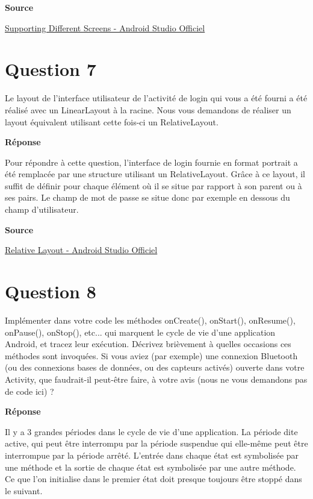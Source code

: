 \documentclass[francais,12pt]{article}
\begin{document}
		\textbf{Source}
        
        \href{https://developer.android.com/training/basics/supporting-devices/screens.html}{Supporting Different Screens - Android Studio Officiel}
		
	\section*{Question 7}
		Le layout de l'interface utilisateur de l'activité de login qui vous a été fourni a été réalisé avec un LinearLayout à la racine. Nous vous demandons de réaliser un layout équivalent utilisant cette fois-ci un RelativeLayout.  
		
		{\color[rgb]{0,0.5,0.23}\textbf{Réponse}}
        
		Pour répondre à cette question, l'interface de login fournie en format portrait a été remplacée par
une structure utilisant un RelativeLayout. Grâce à ce layout, il suffit de définir pour chaque élément où il se situe par rapport à son parent ou à ses pairs. Le champ de mot de passe se situe donc par exemple en dessous du champ d'utilisateur. 
		
		\textbf{Source}
        
        \href{https://developer.android.com/guide/topics/ui/layout/relative.html}{Relative Layout - Android Studio Officiel}
		
		\newpage
	\section*{Question 8}
		Implémenter dans votre code les méthodes onCreate(), onStart(), onResume(), onPause(), onStop(), etc... qui marquent le cycle de vie d'une application Android, et tracez leur exécution. Décrivez brièvement à quelles occasions ces méthodes sont invoquées. Si vous aviez (par exemple) une connexion Bluetooth (ou des connexions bases de données, ou des capteurs activés) ouverte dans votre Activity, que faudrait-il peut-être faire, à votre avis (nous ne vous demandons pas de code ici) ? 
		
		{\color[rgb]{0,0.5,0.23}\textbf{Réponse}}
        
		Il y a 3 grandes périodes dans le cycle de vie d'une application. La période dite active, qui peut être interrompu par la période	suspendue qui elle-même peut être interrompue par la période arrêté.
		L'entrée dans chaque état est symbolisée par une méthode et la sortie de chaque état est symbolisée par une autre méthode. Ce que l'on initialise dans le premier état doit presque toujours être stoppé dans le suivant.
		
\end{document}
